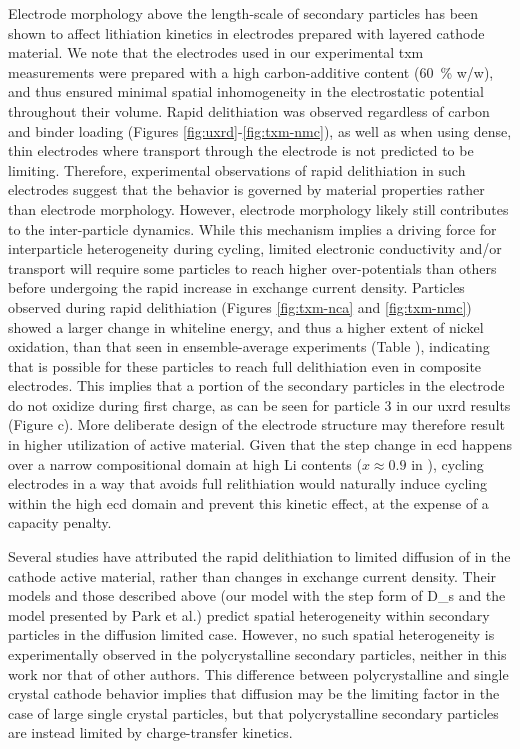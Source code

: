 \documentclass{WileyMSP-template}
\begin{document}
Electrode morphology above the length-scale of secondary particles has
been shown to affect lithiation kinetics in electrodes prepared with
layered cathode
material\cite{battaglia2012,mukherjee2018,mukherjee2020,zhao2022}. We
note that the electrodes used in our experimental \gls{txm}
measurements were prepared with a high carbon-additive content
(\SI{60}{\percent} w/w), and thus ensured minimal spatial
inhomogeneity in the electrostatic potential throughout their
volume. Rapid delithiation was observed regardless of carbon and
binder loading (Figures \ref{fig:uxrd}-\ref{fig:txm-nmc}), as well as
when using dense, thin electrodes\cite{chueh2021} where transport
through the electrode is not predicted to be
limiting\cite{mukherjee2018}. Therefore, experimental observations of
rapid delithiation in such electrodes suggest that the behavior is
governed by material properties rather than electrode
morphology. However, electrode morphology likely still contributes to
the inter-particle dynamics. While this mechanism implies a driving
force for interparticle heterogeneity during cycling\cite{chueh2021},
limited electronic conductivity and/or  transport will
require some particles to reach higher over-potentials than others
before undergoing the rapid increase in exchange current
density. Particles observed during rapid delithiation (Figures
\ref{fig:txm-nca} and \ref{fig:txm-nmc}) showed a larger change in
whiteline energy, and thus a higher extent of nickel oxidation, than
that seen in ensemble-average experiments (Table
), indicating that is possible for
these particles to reach full delithiation even in composite
electrodes. This implies that a portion of the secondary particles in
the electrode do not oxidize during first charge, as can be seen for
particle 3 in our \gls{uxrd} results (Figure
c). More deliberate design of the electrode
structure may therefore result in higher utilization of active
material. Given that the step change in \gls{ecd} happens over a
narrow compositional domain at high Li contents ($x \approx 0.9$ in
), cycling electrodes in a way that avoids full
relithiation would naturally induce cycling within the high \gls{ecd}
domain and prevent this kinetic effect, at the expense of a capacity
penalty.

Several studies have attributed the rapid delithiation to limited
diffusion of  in the cathode active material\cite{rao2021,
  wang2020-6}, rather than changes in exchange current density. Their
models and those described above (our model with the step form of
\gls{D_s} and the model presented by Park et al.\cite{chueh2021})
predict spatial heterogeneity within secondary particles in the
diffusion limited case\cite{wang2020-6}. However, no such spatial
heterogeneity is experimentally observed in the polycrystalline
secondary particles, neither in this work nor that of other
authors\cite{chueh2021, zhao2022}. This difference between
polycrystalline and single crystal cathode behavior implies that
 diffusion may be the limiting factor in the case of large
single crystal particles, but that polycrystalline secondary particles
are instead limited by charge-transfer kinetics.
 
\end{document}
